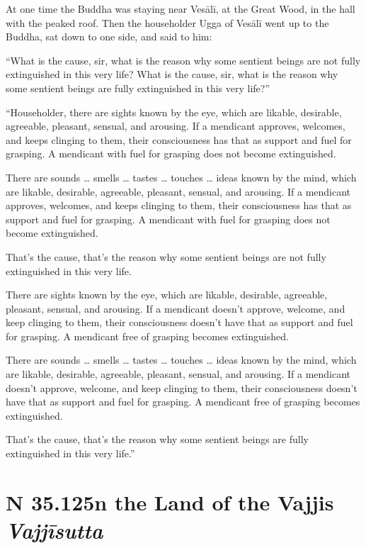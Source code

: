 \documentclass[12pt,openany]{book}%
\newcommand*{\suttatitleacronym}[1]{\smaller[2]{#1}\vspace*{.3em}}
\newcommand*{\suttatitletranslation}[1]{\linebreak{#1}}
\newcommand*{\suttatitleroot}[1]{\linebreak\smaller[2]\itshape{#1}}
\newcommand*{\tocacronym}[1]{\hspace*{-3.3em}{#1}\quad}
\newcommand*{\toctranslation}[1]{#1}
\newcommand*{\tocroot}[1]{(\textit{#1})}
\begin{document}
At one time the Buddha was staying near \textsanskrit{Vesālī}, at the Great Wood, in the hall with the peaked roof. Then the householder Ugga of \textsanskrit{Vesālī} went up to the Buddha, sat down to one side, and said to him: 

“What is the cause, sir, what is the reason why some sentient beings are not fully extinguished in this very life? What is the cause, sir, what is the reason why some sentient beings are fully extinguished in this very life?” 

“Householder, there are sights known by the eye, which are likable, desirable, agreeable, pleasant, sensual, and arousing. If a mendicant approves, welcomes, and keeps clinging to them, their consciousness has that as support and fuel for grasping. A mendicant with fuel for grasping does not become extinguished. 

There are sounds … smells … tastes … touches … ideas known by the mind, which are likable, desirable, agreeable, pleasant, sensual, and arousing. If a mendicant approves, welcomes, and keeps clinging to them, their consciousness has that as support and fuel for grasping. A mendicant with fuel for grasping does not become extinguished. 

That’s the cause, that’s the reason why some sentient beings are not fully extinguished in this very life. 

There are sights known by the eye, which are likable, desirable, agreeable, pleasant, sensual, and arousing. If a mendicant doesn’t approve, welcome, and keep clinging to them, their consciousness doesn’t have that as support and fuel for grasping. A mendicant free of grasping becomes extinguished. 

There are sounds … smells … tastes … touches … ideas known by the mind, which are likable, desirable, agreeable, pleasant, sensual, and arousing. If a mendicant doesn’t approve, welcome, and keep clinging to them, their consciousness doesn’t have that as support and fuel for grasping. A mendicant free of grasping becomes extinguished. 

That’s the cause, that’s the reason why some sentient beings are fully extinguished in this very life.” 

%
\section*{{\suttatitleacronym SN 35.125}{\suttatitletranslation In the Land of the Vajjis }{\suttatitleroot Vajjīsutta}}
\addcontentsline{toc}{section}{\tocacronym{SN 35.125} \toctranslation{In the Land of the Vajjis } \tocroot{Vajjīsutta}}
\end{document}
